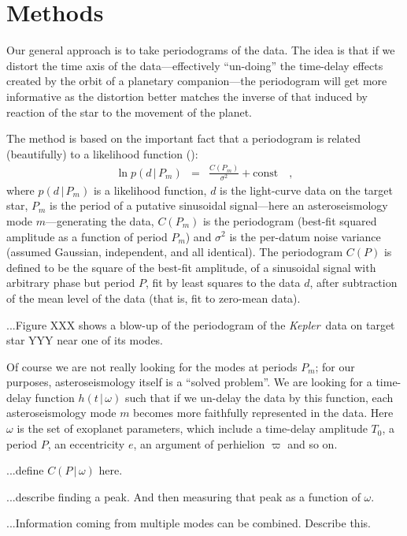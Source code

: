 \documentclass[12pt, preprint]{aastex}
\newcommand{\project}[1]{\textsl{#1}}
\newcommand{\Kepler}{\project{Kepler}}
\newcommand{\given}{\,|\,}
\begin{document}
\section{Methods}

Our general approach is to take periodograms of the data.
The idea is that if we distort the time axis of the data---effectively
``un-doing'' the time-delay effects created by the orbit of a
planetary companion---the periodogram will get more informative as the
distortion better matches the inverse of that induced by reaction of
the star to the movement of the planet.

The method is based on the important fact that a periodogram is
related (beautifully) to a likelihood function (\citealt{bretthorst}):
\begin{eqnarray}
\ln p(d\given P_m) &=& \frac{C(P_m)}{\sigma^2} + \mbox{const}
\quad,
\end{eqnarray}
where $p(d\given P_m)$ is a likelihood function, $d$ is the
light-curve data on the target star, $P_m$ is the period of a putative
sinusoidal signal---here an asteroseismology mode $m$---generating the
data, $C(P_m)$ is the periodogram (best-fit squared amplitude as a
function of period $P_m$) and $\sigma^2$ is the per-datum noise
variance (assumed Gaussian, independent, and all identical).
The periodogram $C(P)$ is defined to be the square of the best-fit
amplitude, of a sinusoidal signal with arbitrary phase but period $P$,
fit by least squares to the data $d$, after subtraction of the mean
level of the data (that is, fit to zero-mean data).

...Figure XXX shows a blow-up of the periodogram of the \Kepler\ data
on target star YYY near one of its modes.

Of course we are not really looking for the modes at periods $P_m$;
for our purposes, asteroseismology itself is a ``solved problem''.
We are looking for a time-delay function $h(t\given \omega)$ such that
if we un-delay the data by this function, each asteroseismology mode
$m$ becomes more faithfully represented in the data.
Here $\omega$ is the set of exoplanet parameters, which include a
time-delay amplitude $T_0$, a period $P$, an eccentricity $e$, an
argument of perhielion $\varpi$ and so on.

...define $C(P\given \omega)$ here.

...describe finding a peak.  And then measuring that peak as a
function of $\omega$.

...Information coming from multiple modes can be combined.  Describe
this.
\end{document}

